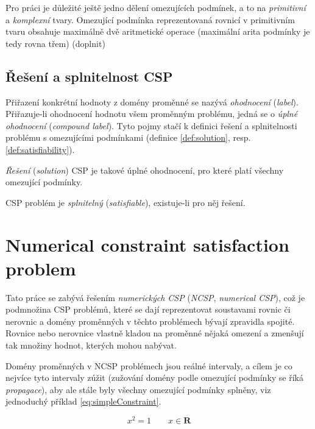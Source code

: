 Pro práci je důležité ještě jedno dělení omezujících podmínek, a to na \emph{primitivní} a \emph{komplexní} tvary. Omezující podmínka reprezentovaná rovnicí v primitivním tvaru obsahuje maximálně dvě aritmetické operace (maximální arita podmínky je tedy rovna třem) (doplnit)

\subsection{Řešení a splnitelnost CSP}
Přiřazení konkrétní hodnoty z domény proměnné se nazývá \emph{ohodnocení} (\emph{label}). Přiřazuje-li ohodnocení hodnotu všem proměnným problému, jedná se o \emph{úplné ohodnocení} (\emph{compound label}). Tyto pojmy stačí k definici řešení a splnitelnosti problému s omezujícími podmínkami (definice \ref{def:solution}, resp. \ref{def:satisfiability}).

\begin{definition}
\label{def:solution}
\emph{Řešení} (\emph{solution}) CSP je takové úplné ohodnocení, pro které platí všechny omezující podmínky.
\end{definition}

\begin{definition}
\label{def:satisfiability}
CSP problém je \emph{splnitelný} (\emph{satisfiable}), existuje-li pro něj řešení.
\end{definition}


\section{Numerical constraint satisfaction problem}

Tato práce se zabývá řešením \emph{numerických CSP} (\emph{NCSP}, \emph{numerical CSP}), což je podmnožina CSP problémů, které se dají reprezentovat soustavami rovnic či nerovnic a domény proměnných v těchto problémech bývají zpravidla spojité. Rovnice nebo nerovnice vlastně kladou na proměnné nějaká omezení a zmenšují tak množiny hodnot, kterých mohou nabývat.

Domény proměnných v NCSP problémech jsou reálné intervaly, a cílem je co nejvíce tyto intervaly zúžit (zužování domény podle omezující podmínky se říká \emph{propagace}), aby ale stále byly všechny omezující podmínky splněny, viz jednoduchý příklad \ref{eq:simpleConstraint}.

\begin{equation} \label{eq:simpleConstraint}
x^2 = 1\qquad x \in \boldsymbol{R}
\end{equation}

